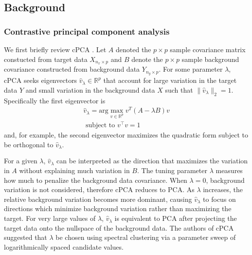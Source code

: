 \documentclass[10pt]{article}
\begin{document}
\subsection{Background\label{sec:background}}
\subsubsection{Contrastive principal component analysis }
We first briefly review cPCA \cite{Abid}. Let $A$ denoted the $p\times p$ sample covariance matrix constucted from target data $X_{n_x \times p}$ and $B$ denote the $p\times p$ sample background covariance constructed from background data $Y_{n_y \times p}$. For some parameter $\lambda$, cPCA seeks eigenvectors $\hat{v}_\lambda \in \mathbb{R}^p$ that account for large variation in the target data $Y$ and small variation in the background data $X$ such that $\|\hat{v}_\lambda\|_2 = 1$. Specifically the first eigenvector is
\begin{equation}
  \label{eq:cpca}
  \begin{aligned}
  \hat{v}_\lambda = \text{arg}\max_{v \in \mathbb{R}^p}{v^T\left(A - \lambda B\right)v} \\\mbox{ subject to } v^\top v = 1 
  \end{aligned}
\end{equation}
and, for example, the second eigenvector maximizes the quadratic form subject to be orthogonal to $\hat{v}_\lambda$.

For a given $\lambda$, $\hat{v}_\lambda$ can be interpreted as the direction that maximizes the variation in $A$ without explaining much variation in $B$. The tuning parameter $\lambda$ measures how much to penalize the background data covariance. When $\lambda = 0$, background variation is not considered, therefore cPCA reduces to PCA. As $\lambda$ increases, the relative background variation becomes more dominant, causing $\hat{v}_\lambda$ to focus on directions which minimize background variation rather than maximizing the target. For very large values of $\lambda$, $\hat{v}_\lambda$ is equivalent to PCA after projecting the target data onto the nullspace of the background data.  The authors of cPCA suggested that $\lambda$ be chosen using spectral clustering via a parameter sweep of logarithmically spaced candidate values.
\end{document}
